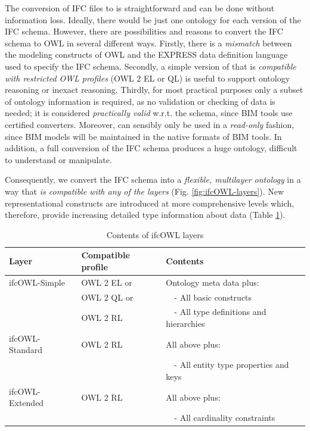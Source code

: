 The conversion of IFC files to \ifcrdf{} is straightforward and can be done 
without information loss.
Ideally, there would be just one \ifcowl{} ontology for each version of the IFC schema. However,
there are possibilities and reasons to convert the IFC schema to OWL in several different ways. Firstly, there is a \emph{mismatch} between the modeling constructs of OWL and the 
EXPRESS data definition language \cite{schenck1994information} used to specify the IFC schema. Secondly, a simple version of \ifcowl{} that is \emph{compatible with
restricted OWL profiles} (OWL 2 EL or QL) \cite{motik2012owl} is useful to support ontology
reasoning or inexact reasoning. Thirdly, for most practical purposes only a subset of ontology
information is required, as no validation or checking of \ifcrdf{} data is needed; it is considered \emph{practically valid} w.r.t. the schema, since BIM tools use certified converters. Moreover, \ifcrdf{} can sensibly only be used in a
\emph{read-only} fashion, since BIM models will be maintained in the native formats of BIM
tools. In addition, a full conversion of the IFC schema produces a huge ontology, difficult to understand or manipulate.

Consequently, we convert the IFC schema into a \emph{flexible, multilayer \ifcowl{} ontology}
in a way that \emph{\ifcrdf{} is compatible with any of the layers} (Fig. \ref{fig:ifcOWL-layers}). 
New representational constructs are introduced at more comprehensive levels which, therefore, 
provide increasing detailed type information about \ifcrdf{} data (Table \ref{tab:ifcOWL-layers}).

\begin{table}
    \caption{Contents of ifcOWL layers}
    \label{tab:ifcOWL-layers}
    \centering
    \scriptsize
    \def\arraystretch{1.2}          %
    \setlength{\tabcolsep}{6pt}     %
    \begin{tabularx}{0.95\textwidth}{|l|l|X|}
        \hline
            \textbf{Layer} & \textbf{Compatible profile} & \textbf{Contents} \\
        \hline
            ifcOWL-Simple & OWL 2 EL or & Ontology meta data plus: \\
            & OWL 2 QL or & \ \ - All basic constructs \\
            & OWL 2 RL & \ \ - All type definitions and hierarchies \\
        \hline 
            ifcOWL-Standard & OWL 2 RL & All above plus: \\
            & & \ \ - All entity type properties and keys \\
        \hline
            ifcOWL-Extended & OWL 2 RL & All above plus: \\
            & & \ \ - All cardinality constraints \\
        \hline
    \end{tabularx}
\end{table}

